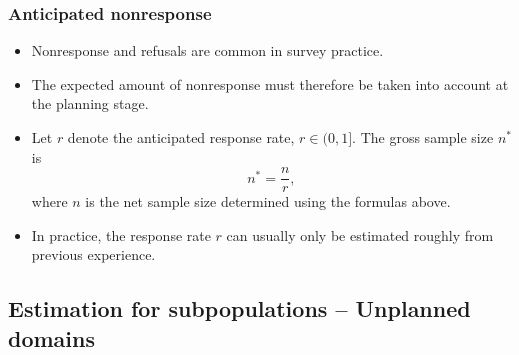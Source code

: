 \documentclass{my_eth_beamer}
\numberwithin{equation}{section}
\begin{document}
\begin{frame}
    \frametitle{\normalsize Anticipated nonresponse}
    \begin{itemize}
    \setlength{\itemsep}{12pt}
        \item \alert{Nonresponse and refusals} are common in survey practice.
        \item The \alert{expected amount} of nonresponse must therefore be
            taken into account at the planning stage.
        \item Let $r$ denote the anticipated response rate, $r \in (0,1]$.
            The \alert{gross sample size} $n^*$ is
            \begin{equation*}
                n^* = \frac{n}{r},
            \end{equation*}
            \noindent where $n$ is the \alert{net sample size} determined
            using the formulas above.
        \item In practice, the response rate $r$ can usually only be estimated
            \alert{roughly} from previous experience.
    \end{itemize}
\end{frame}

\subsection{Estimation for subpopulations -- Unplanned domains}
\end{document}
